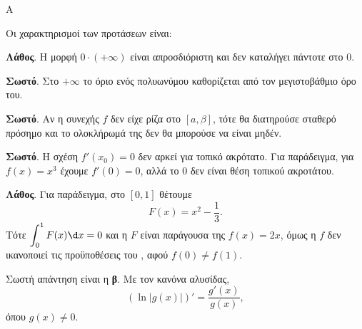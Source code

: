 \begin{thema}{Α}
\begin{erwthma}
\item {}

\item {}

\item {}

\item Οι χαρακτηρισμοί των προτάσεων είναι:
\begin{alist}
\item \textbf{Λάθος}. Η μορφή $0\cdot(+\infty)$ είναι απροσδιόριστη και δεν καταλήγει πάντοτε στο $0$.
\item \textbf{Σωστό}. Στο $+\infty$ το όριο ενός πολυωνύμου καθορίζεται από τον μεγιστοβάθμιο όρο του.
\item \textbf{Σωστό}. Αν η συνεχής $f$ δεν είχε ρίζα στο $[a,\beta]$, τότε θα διατηρούσε σταθερό πρόσημο και το ολοκλήρωμά της δεν θα μπορούσε να είναι μηδέν.
\item \textbf{Σωστό}. Η σχέση $f'(x_0)=0$ δεν αρκεί για τοπικό ακρότατο. Για παράδειγμα, για $f(x)=x^3$ έχουμε $f'(0)=0$, αλλά το $0$ δεν είναι θέση τοπικού ακροτάτου.
\item \textbf{Λάθος}. Για παράδειγμα, στο $[0,1]$ θέτουμε
\[ F(x)=x^2-\dfrac{1}{3}. \]
Τότε $\dint_0^1 F(x)\d x=0$ και η $F$ είναι παράγουσα της $f(x)=2x$, όμως η $f$ δεν ικανοποιεί τις προϋποθέσεις του , αφού $f(0)\neq f(1)$.
\end{alist}

\item Σωστή απάντηση είναι η \textbf{β}. Με τον κανόνα αλυσίδας,
\[ \left(\ln|g(x)|\right)'=\dfrac{g'(x)}{g(x)}, \]
όπου $g(x)\neq0$.
\end{erwthma}
\end{thema}


